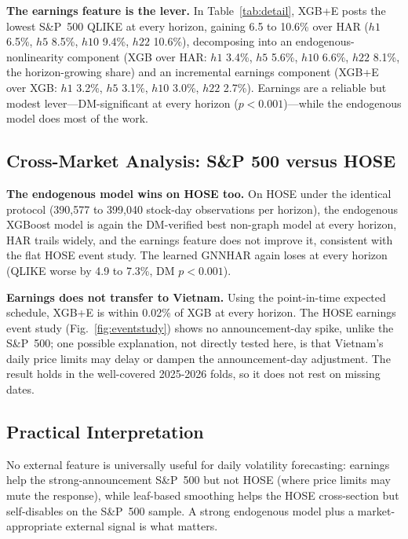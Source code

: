 \documentclass[runningheads,a4paper]{llncs}
\begin{document}
\textbf{The earnings feature is the lever.} In Table~\ref{tab:detail}, XGB+E posts the lowest S\&P~500
QLIKE at every horizon, gaining 6.5 to 10.6\% over HAR ($h1$ 6.5\%, $h5$ 8.5\%, $h10$ 9.4\%, $h22$ 10.6\%),
decomposing into an endogenous-nonlinearity component (XGB over HAR: $h1$ 3.4\%, $h5$ 5.6\%, $h10$ 6.6\%,
$h22$ 8.1\%, the horizon-growing share) and an incremental earnings component (XGB+E over XGB: $h1$ 3.2\%,
$h5$ 3.1\%, $h10$ 3.0\%, $h22$ 2.7\%). Earnings are a reliable but modest lever---DM-significant at every
horizon ($p<0.001$)---while the endogenous model does most of the work.

\subsection{Cross-Market Analysis: S\&P 500 versus HOSE}\label{sec:hose}
\textbf{The endogenous model wins on HOSE too.} On HOSE under the identical protocol
(390{,}577 to 399{,}040 stock-day observations per horizon), the endogenous XGBoost model is again the
DM-verified best non-graph model at every horizon, HAR trails widely, and the earnings feature does not
improve it, consistent with the flat HOSE event study. The learned GNNHAR again loses at
every horizon (QLIKE worse by 4.9 to 7.3\%, DM $p<0.001$).

\textbf{Earnings does not transfer to Vietnam.} Using the point-in-time expected schedule, XGB+E is within
0.02\% of XGB at every horizon. The HOSE earnings event study (Fig.~\ref{fig:eventstudy}) shows no
announcement-day spike, unlike the S\&P~500; one possible explanation, not directly tested here, is that
Vietnam's daily price limits may delay or dampen the announcement-day adjustment. The result holds in the
well-covered 2025-2026 folds, so it does not rest on missing dates.

\subsection{Practical Interpretation}
No external feature is universally useful for daily volatility forecasting: earnings help the
strong-announcement S\&P~500 but not HOSE (where price limits may mute the response), while
leaf-based smoothing helps the HOSE cross-section but self-disables on the S\&P~500 sample. A strong
endogenous model plus a market-appropriate external signal is what matters.
\end{document}
